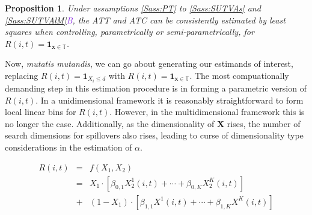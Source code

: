 \documentclass{article}
\newtheorem{proposition}{Proposition}
\newcommand{\asref}[2]{\ref{#1}{\textcolor{BlueViolet}{#2}}}
\begin{document}
\begin{spacing}{1.3}
\begin{proposition}
\label{Pass:ATTnonP}
Under assumptions \ref{Sass:PT} to \ref{Sass:SUTVAs} and
\asref{Sass:SUTVAlM}{B}, the ATT and ATC can be consistently estimated
by least squares when controlling, parametrically or
semi-parametrically, for $R(i,t)=\mathbf{1}_{\mathbf{x}\in
  \mathbb{T}}$. 
\end{proposition}

Now, \emph{mutatis mutandis}, we can go about generating our estimands of
interest, replacing $R(i,t)=\mathbf{1}_{X_i\leq d}$ with
$R(i,t)=\mathbf{1}_{\mathbf{x}\in \mathbb{T}}$.  The most compuationally
demanding step in this estimation procedure is in forming a parametric
version of $R(i,t)$.  In a unidimensional framework it is reasonably straightforward
to form local linear bins for $R(i,t)$.  However, in the multidimensional framework
this is no longer the case.  Additionally, as the dimensionality of $\mathbf{X}$
rises, the number of search dimensions for spillovers also rises, leading to 
curse of dimensionality type considerations in the estimation of $\alpha$.

\begin{eqnarray}
R(i,t)&=&f(X_1,X_2) \nonumber \\
      &=&X_1\cdot[\beta_{0,1}X_2^1(i,t)+ \cdots + \beta_{0,K}X_2^K(i,t)] \nonumber \\
      &+& (1-X_1)\cdot[\beta_{1,1}X^1(i,t)+ \cdots + \beta_{1,K}X^K(i,t)] \nonumber
\end{eqnarray}




\end{spacing}
\end{document}
